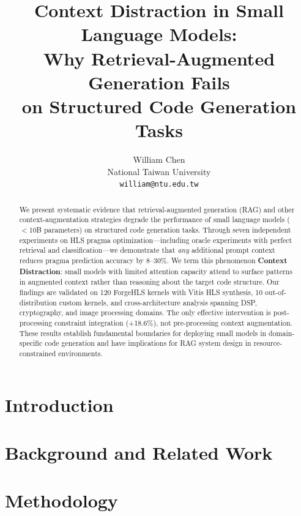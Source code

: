 \documentclass{article}
\title{Context Distraction in Small Language Models:\\
Why Retrieval-Augmented Generation Fails\\on Structured Code Generation Tasks}
\author{
William Chen \\
National Taiwan University \\
\texttt{william@ntu.edu.tw}
}
\begin{document}
\maketitle

\begin{abstract}
We present systematic evidence that retrieval-augmented generation (RAG)
and other context-augmentation strategies degrade the performance of small
language models ($<$10B parameters) on structured code generation tasks.
Through seven independent experiments on HLS pragma optimization—including
oracle experiments with perfect retrieval and classification—we demonstrate
that \emph{any} additional prompt context reduces pragma prediction accuracy
by 8–30\%. We term this phenomenon \textbf{Context Distraction}: small
models with limited attention capacity attend to surface patterns in
augmented context rather than reasoning about the target code structure.
Our findings are validated on 120 ForgeHLS kernels with Vitis HLS synthesis,
10 out-of-distribution custom kernels, and cross-architecture analysis
spanning DSP, cryptography, and image processing domains.
The only effective intervention is post-processing constraint integration
(+18.6\%), not pre-processing context augmentation.
These results establish fundamental boundaries for deploying small models
in domain-specific code generation and have implications for RAG system
design in resource-constrained environments.
\end{abstract}


\section{Introduction}

\section{Background and Related Work}

\section{Methodology}
\end{document}
